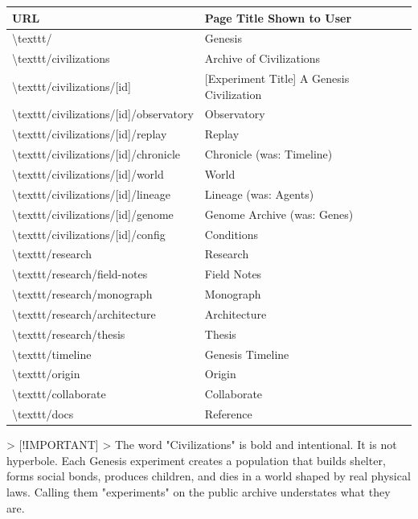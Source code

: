\documentclass[11pt,a4paper]{article}
\begin{document}
\begin{longtable}{ll}
\toprule
URL & Page Title Shown to User \\
\midrule
\endhead
\textbackslash{}texttt{/} & Genesis \\
\textbackslash{}texttt{/civilizations} & Archive of Civilizations \\
\textbackslash{}texttt{/civilizations/[id]} & [Experiment Title]  A Genesis Civilization \\
\textbackslash{}texttt{/civilizations/[id]/observatory} & Observatory \\
\textbackslash{}texttt{/civilizations/[id]/replay} & Replay \\
\textbackslash{}texttt{/civilizations/[id]/chronicle} & Chronicle (was: Timeline) \\
\textbackslash{}texttt{/civilizations/[id]/world} & World \\
\textbackslash{}texttt{/civilizations/[id]/lineage} & Lineage (was: Agents) \\
\textbackslash{}texttt{/civilizations/[id]/genome} & Genome Archive (was: Genes) \\
\textbackslash{}texttt{/civilizations/[id]/config} & Conditions \\
\textbackslash{}texttt{/research} & Research \\
\textbackslash{}texttt{/research/field-notes} & Field Notes \\
\textbackslash{}texttt{/research/monograph} & Monograph \\
\textbackslash{}texttt{/research/architecture} & Architecture \\
\textbackslash{}texttt{/research/thesis} & Thesis \\
\textbackslash{}texttt{/timeline} & Genesis Timeline \\
\textbackslash{}texttt{/origin} & Origin \\
\textbackslash{}texttt{/collaborate} & Collaborate \\
\textbackslash{}texttt{/docs} & Reference \\
\bottomrule
\end{longtable}

\textgreater{} [!IMPORTANT]
\textgreater{} The word "Civilizations" is bold and intentional. It is not hyperbole. Each Genesis experiment creates a population that builds shelter, forms social bonds, produces children, and dies  in a world shaped by real physical laws. Calling them "experiments" on the public archive understates what they are.
\end{document}
